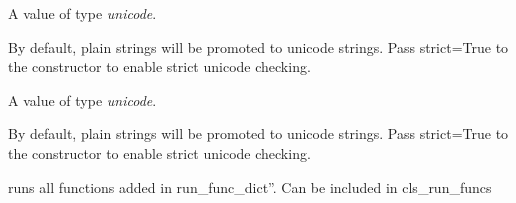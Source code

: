 \documentclass[letterpaper,10pt,english]{sphinxmanual}
\begin{document}
\begin{fulllineitems}
\begin{fulllineitems}
\end{fulllineitems}


\begin{fulllineitems}
\label{core_doc/agent:taref.core.agent.Operative.desc}
A value of type \emph{unicode}.

By default, plain strings will be promoted to unicode strings. Pass
strict=True to the constructor to enable strict unicode checking.

\end{fulllineitems}


\begin{fulllineitems}
\label{core_doc/agent:taref.core.agent.Operative.name}
A value of type \emph{unicode}.

By default, plain strings will be promoted to unicode strings. Pass
strict=True to the constructor to enable strict unicode checking.

\end{fulllineitems}


\begin{fulllineitems}
\label{core_doc/agent:taref.core.agent.Operative.run_all}
runs all functions added in run\_func\_dict''. Can be included in cls\_run\_funcs

\end{fulllineitems}


\begin{fulllineitems}
\label{core_doc/agent:taref.core.agent.Operative.run_func_dict}
\end{fulllineitems}


\begin{fulllineitems}
\label{core_doc/agent:taref.core.agent.Operative.show}
\end{fulllineitems}


\end{fulllineitems}
\end{document}
